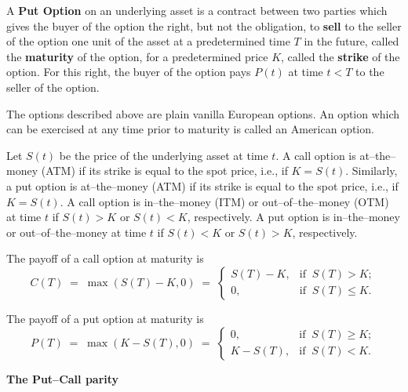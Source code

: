 A \textbf{Put Option} on an underlying asset is a contract between two parties which
gives the buyer of the option the right, but not the obligation, to \textbf{sell} to
the seller of the option one unit of the asset at a predetermined time $T$ in the
future, called the \textbf{maturity} of the option, for a predetermined price $K$,
called the \textbf{strike} of the option. For this right, the buyer of the option
pays $P(t)$ at time $t < T$ to the seller of the option.

The options described above are plain vanilla European options. An option which can
be exercised at any time prior to maturity is called an American option.

Let $S(t)$ be the price of the underlying asset at time $t$. A call option is
at--the--money (ATM) if its strike is equal to the spot price, i.e., if $K = S(t)$.
Similarly, a put option is at--the--money (ATM) if its strike is equal to the spot
price, i.e., if $K = S(t)$. A call option is in--the--money (ITM) or
out--of--the--money (OTM) at time $t$ if $S(t) > K$ or $S(t) < K$, respectively. A
put option is in--the--money or out--of--the--money at time $t$ if $S(t) < K$ or
$S(t) > K$, respectively.

The payoff of a call option at maturity is
\begin{equation}
C(T) \;=\; \max(S(T)-K,0) \;=\; \begin{cases} S(T)-K, & \text{if} \;\; S(T) > K; \\
0, & \text{if} \;\; S(T) \le K. \end{cases}
\end{equation}

The payoff of a put option at maturity is
\begin{equation}
P(T) \;=\; \max(K-S(T),0) \;=\; \begin{cases} 0, & \text{if} \;\; S(T) \ge K; \\
K-S(T), & \text{if} \;\; S(T) < K. \end{cases}
\end{equation}

\medskip
\noindent\textbf{The Put--Call parity}
